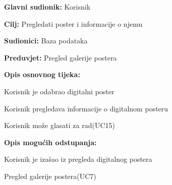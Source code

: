 					\noindent {}
					\begin{packed_item}
						
						\item \textbf{Glavni sudionik: } Korisnik
						\item  \textbf{Cilj:} Pregledati poster i informacije o njemu
						\item  \textbf{Sudionici:} Baza podataka
						\item  \textbf{Preduvjet:} Pregled galerije postera
						\item  \textbf{Opis osnovnog tijeka:}
						
						\item[] \begin{packed_enum}
							
							\item Korisnik je odabrao digitalni poster
							\item Korisnik pregledava informacije o digitalnom posteru
							\item Korisnik može glasati za rad(UC15)
						\end{packed_enum}
						
						\item  \textbf{Opis mogućih odstupanja:}
						
						\item[] \begin{packed_item}
							
							\item[2.a] Korisnik je izašao iz pregleda digitalnog postera
							\item[] \begin{packed_enum}
								
								\item Pregled galerije postera(UC7)
								
							\end{packed_enum}
							
						\end{packed_item}
					\end{packed_item}
					
